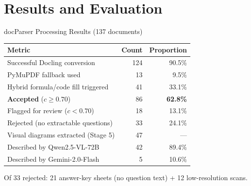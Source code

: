 \documentclass[aspectratio=169]{beamer}
\begin{document}
\section{Results and Evaluation}

\begin{frame}{docParser Processing Results (137 documents)}
  \centering
  \begin{tabular}{lrr}
    \toprule
    \textbf{Metric} & \textbf{Count} & \textbf{Proportion} \\
    \midrule
    Successful Docling conversion       & 124 & 90.5\% \\
    PyMuPDF fallback used               &  13 &  9.5\% \\
    Hybrid formula/code fill triggered  &  41 & 33.1\% \\
    \midrule
    \textbf{Accepted} ($c \geq 0.70$)   &  86 & \textbf{62.8\%} \\
    Flagged for review ($c < 0.70$)     &  18 & 13.1\% \\
    Rejected (no extractable questions) &  33 & 24.1\% \\
    \midrule
    Visual diagrams extracted (Stage 5) &  47 & --- \\
    \quad Described by Qwen2.5-VL-72B   &  42 & 89.4\% \\
    \quad Described by Gemini-2.0-Flash &   5 & 10.6\% \\
    \bottomrule
  \end{tabular}

  \vspace{4pt}
  \small Of 33 rejected: 21 answer-key sheets (no question text) +
         12 low-resolution scans.
\end{frame}
\end{document}
